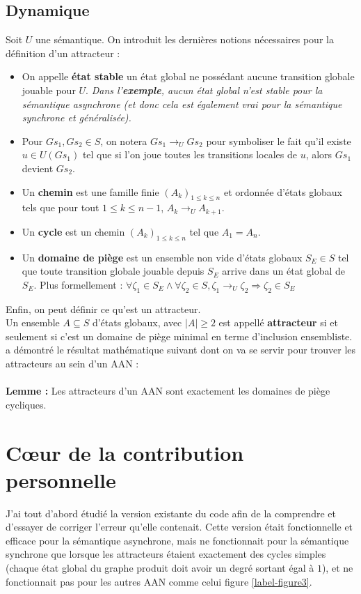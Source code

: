 \documentclass[10pt,a4paper]{article}
\begin{document}
\subsection{Dynamique}
Soit $U$ une sémantique. On introduit les dernières notions nécessaires pour la définition d'un attracteur :
\begin{itemize}
	\item On appelle \textbf{état stable} un état global ne possédant aucune transition globale jouable pour $U$.
	\emph{Dans l'\textbf{exemple}, aucun état global n'est stable pour la sémantique asynchrone (et donc cela est également vrai pour la sémantique synchrone et généralisée).}
	\item Pour $Gs_1,Gs_2\in S$, on notera $Gs_1\rightarrow _UGs_2$ pour symboliser le fait qu'il existe $u\in U(Gs_1)$ tel que si l'on joue toutes les transitions locales de $u$, alors $Gs_1$ devient $Gs_2$.
	\item Un \textbf{chemin} est une famille finie $(A_k)_{1\leq k\leq n}$ et ordonnée d'états globaux tels que pour tout $1\leq k\leq n-1$, $A_k\rightarrow _U A_{k+1}$.
	\item Un \textbf{cycle} est un chemin $(A_k)_{1\leq k\leq n}$ tel que $A_1=A_n$.
	\item Un \textbf{domaine de piège} est un ensemble non vide d'états globaux $S_E\in S$ tel que toute transition globale jouable depuis $S_E$ arrive dans un état global de $S_E$. Plus formellement : 
	$\forall\zeta _1\in S_E \wedge\forall\zeta _2\in S, \zeta _1 \rightarrow _U\zeta _2 \Rightarrow\zeta _2\in S_E$
\end{itemize}
Enfin, on peut définir ce qu'est un attracteur.\\
Un ensemble $A\subseteq S$ d'états globaux, avec $|A|\geq2$ est appellé \textbf{attracteur} si et seulement si c'est un domaine de piège minimal en terme d'inclusion ensembliste.\\
\cite{chapitre} a démontré le résultat mathématique suivant dont on va se servir pour trouver les attracteurs au sein d'un AAN :\\ \\
\textbf{Lemme :} Les attracteurs d'un AAN sont exactement les domaines de piège cycliques.

\section{Cœur de la contribution personnelle}
\label{ccp}
\hypertarget{debutpartie4}{
J'ai tout d'abord étudié la version existante du code afin de la comprendre et d'essayer de corriger l'erreur qu'elle contenait. Cette version était fonctionnelle et efficace pour la sémantique asynchrone, mais ne fonctionnait pour 
la sémantique synchrone que lorsque les attracteurs étaient exactement des cycles simples (chaque état global du graphe produit doit avoir un degré sortant égal à $1$), et ne fonctionnait pas pour les autres AAN comme 
celui figure \ref{label-figure3}.\\ \\ \\
}
\end{document}
